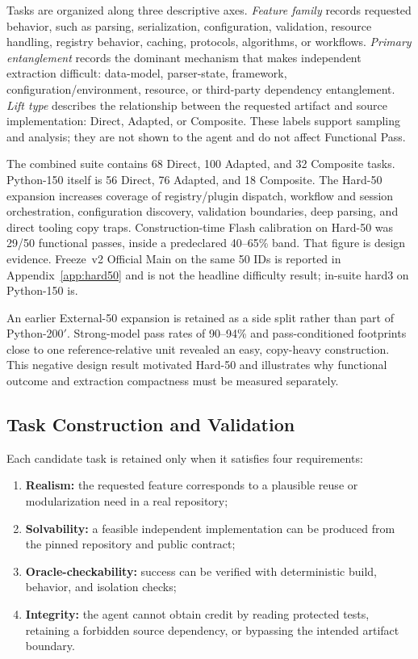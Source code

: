 Tasks are organized along three descriptive axes. \emph{Feature family}
records requested behavior, such as parsing, serialization, configuration,
validation, resource handling, registry behavior, caching, protocols,
algorithms, or workflows. \emph{Primary entanglement} records the dominant
mechanism that makes independent extraction difficult: data-model,
parser-state, framework, configuration/environment, resource, or third-party
dependency entanglement. \emph{Lift type} describes the relationship between
the requested artifact and source implementation: Direct, Adapted, or
Composite. These labels support sampling and analysis; they are not shown to
the agent and do not affect Functional Pass.

The combined suite contains 68 Direct, 100 Adapted, and 32 Composite tasks.
Python-150 itself is 56 Direct, 76 Adapted, and 18 Composite. The Hard-50
expansion increases coverage of registry/plugin dispatch, workflow and session
orchestration, configuration discovery, validation boundaries, deep parsing,
and direct tooling copy traps. Construction-time Flash calibration on Hard-50
was 29/50 functional passes, inside a predeclared 40--65\% band. That figure
is design evidence. Freeze~v2 Official Main on the same 50 IDs is reported in
Appendix~\ref{app:hard50} and is not the headline difficulty result; in-suite
hard3 on Python-150 is.

An earlier External-50 expansion is retained as a side split rather than part
of Python-200$'$. Strong-model pass rates of 90--94\% and pass-conditioned
footprints close to one reference-relative unit revealed an easy, copy-heavy
construction. This negative design result motivated Hard-50 and illustrates why
functional outcome and extraction compactness must be measured separately.

\subsection{Task Construction and Validation}

Each candidate task is retained only when it satisfies four requirements:
\begin{enumerate}
  \item \textbf{Realism:} the requested feature corresponds to a plausible
        reuse or modularization need in a real repository;
  \item \textbf{Solvability:} a feasible independent implementation can be
        produced from the pinned repository and public contract;
  \item \textbf{Oracle-checkability:} success can be verified with
        deterministic build, behavior, and isolation checks;
  \item \textbf{Integrity:} the agent cannot obtain credit by reading
        protected tests, retaining a forbidden source dependency, or bypassing
        the intended artifact boundary.
\end{enumerate}

